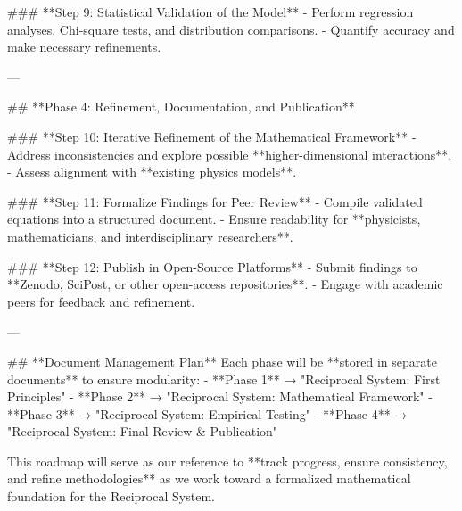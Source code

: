 ### **Step 9: Statistical Validation of the Model**
- Perform regression analyses, Chi-square tests, and distribution comparisons.
- Quantify accuracy and make necessary refinements.

---

## **Phase 4: Refinement, Documentation, and Publication**

### **Step 10: Iterative Refinement of the Mathematical Framework**
- Address inconsistencies and explore possible **higher-dimensional interactions**.
- Assess alignment with **existing physics models**.

### **Step 11: Formalize Findings for Peer Review**
- Compile validated equations into a structured document.
- Ensure readability for **physicists, mathematicians, and interdisciplinary researchers**.

### **Step 12: Publish in Open-Source Platforms**
- Submit findings to **Zenodo, SciPost, or other open-access repositories**.
- Engage with academic peers for feedback and refinement.

---

## **Document Management Plan**
Each phase will be **stored in separate documents** to ensure modularity:
- **Phase 1** → "Reciprocal System: First Principles"
- **Phase 2** → "Reciprocal System: Mathematical Framework"
- **Phase 3** → "Reciprocal System: Empirical Testing"
- **Phase 4** → "Reciprocal System: Final Review & Publication"

This roadmap will serve as our reference to **track progress, ensure consistency, and refine methodologies** as we work toward a formalized mathematical foundation for the Reciprocal System.

